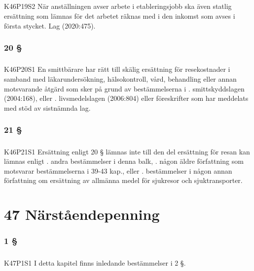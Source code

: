 \documentclass[a4paper,notitlepage,openany,10pt]{book}
\begin{document}
\paragraph*{}
{\tiny K46P19S2}
När anställningen avser arbete i etableringsjobb ska även statlig ersättning som lämnas för det arbetet räknas med i den inkomst som avses i första stycket.
Lag (2020:475).
\subsection*{20 §}
\paragraph*{}
{\tiny K46P20S1}
En smittbärare har rätt till skälig ersättning för resekostnader i samband med läkarundersökning, hälsokontroll, vård, behandling eller annan motsvarande åtgärd som sker på grund av bestämmelserna i
. smittskyddslagen (2004:168), eller
. livsmedelslagen (2006:804) eller föreskrifter som har meddelats med stöd av sistnämnda lag.
\subsection*{21 §}
\paragraph*{}
{\tiny K46P21S1}
Ersättning enligt 20 § lämnas inte till den del ersättning för resan kan lämnas enligt
. andra bestämmelser i denna balk,
. någon äldre författning som motsvarar bestämmelserna i 39-43 kap., eller
. bestämmelser i någon annan författning om ersättning av allmänna medel för sjukresor och sjuktransporter.
\chapter*{47 Närståendepenning}
\subsection*{1 §}
\paragraph*{}
{\tiny K47P1S1}
I detta kapitel finns inledande bestämmelser i 2 §.
\end{document}
